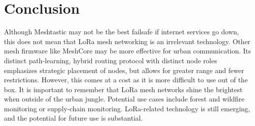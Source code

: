 \documentclass[11pt]{article}
\begin{document}
\section{Conclusion}

Although Meshtastic may not be the best failsafe if internet services go down, this does not mean that LoRa mesh networking is an irrelevant technology. Other mesh firmware like MeshCore may be more effective for urban communication. Its distinct path-learning, hybrid routing protocol with distinct node roles emphasizes strategic placement of nodes, but allows for greater range and fewer restrictions. However, this comes at a cost as it is more difficult to use out of the box. It is important to remember that LoRa mesh networks shine the brightest when outside of the urban jungle. Potential use cases include forest and wildfire monitoring or supply-chain monitoring. LoRa-related technology is still emerging, and the potential for future use is substantial.

\printbibliography
\end{document}
